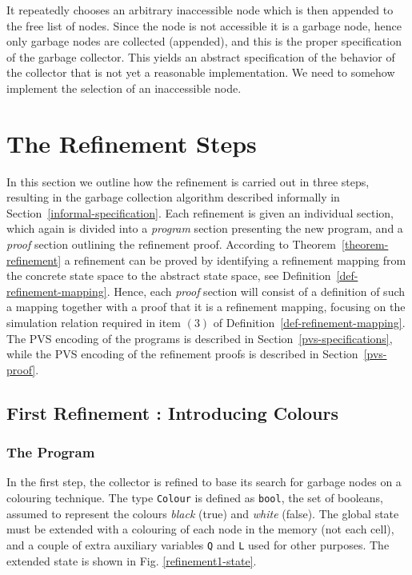 It repeatedly chooses an arbitrary inaccessible node which  is 
then appended  to  the free list   of  nodes. Since   the  node is not
accessible it     is a garbage   node, hence   only garbage  nodes are
collected  (appended),  and this is the   proper  specification of the
garbage collector.  This yields an abstract specification of the behavior
of the collector that is not yet a reasonable implementation.
We need to somehow implement the selection of an inaccessible node.  


\section{The Refinement Steps}
\label{refinement-steps}

In this section we outline how the refinement  is carried out in three
steps,  resulting  in   the  garbage collection   algorithm  described
informally in Section~\ref{informal-specification}\@.  Each refinement is
given  an individual  section, which   again is  divided  into a  {\em
  program}  section  presenting  the new program,   and a  {\em proof}
section  outlining the  refinement  proof.  According  to
Theorem~\ref{theorem-refinement}  a refinement    can be   proved by
identifying a refinement mapping from the concrete  state space to the
abstract state  space,  see Definition~\ref{def-refinement-mapping}\@.  
Hence, each {\em proof} section will consist of a definition of such a
mapping together with a proof that it is a refinement mapping, focusing
on   the  simulation relation required in  item $(3)$ of
Definition~\ref{def-refinement-mapping}\@.  The   PVS encoding  of  the
programs is described in  Section~\ref{pvs-specifications}, while the PVS 
encoding of the refinement proofs is described in Section~\ref{pvs-proof}\@.


\subsection{First Refinement : Introducing Colours}
\label{first-refinement}

\subsubsection{The Program}

In  the first step, the  collector is refined  to base  its search for
garbage nodes  on a colouring  technique.  The  type {\tt  Colour}  is
defined as {\tt bool},  the set of  booleans, assumed to represent the
colours {\em black}   (true) and {\em  white} (false)\@.    The global
state must be  extended with  a colouring  of each node  in the memory
(not each cell), and a couple of extra auxiliary variables {\tt Q} and
{\tt L} used for other purposes.  The extended state is shown in Fig. 
\ref{refinement1-state}.

